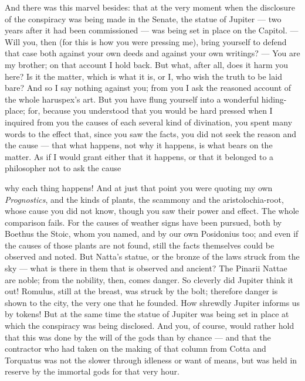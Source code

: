  And there was this marvel besides: that at the very moment when the disclosure of the conspiracy was being made in the Senate, the statue of Jupiter — two years after it had been commissioned — was being set in place on the Capitol. — Will you, then (for this is how you were pressing me), bring yourself to defend that case both against your own deeds and against your own writings? — You are my brother; on that account I hold back. But what, after all, does it harm you here? Is it the matter, which is what it is, or I, who wish the truth to be laid bare? And so I say nothing against you; from you I ask the reasoned account of the whole haruspex's art. But you have flung yourself into a wonderful hiding-place; for, because you understood that you would be hard pressed when I inquired from you the causes of each several kind of divination, you spent many words to the effect that, since you saw the facts, you did not seek the reason and the cause — that what happens, not why it happens, is what bears on the matter. As if I would grant either that it happens, or that it belonged to a philosopher not to ask the cause

 why each thing happens! And at just that point you were quoting my own \textit{Prognostics}, and the kinds of plants, the scammony and the aristolochia-root, whose cause you did not know, though you saw their power and effect. The whole comparison fails. For the causes of weather signs have been pursued, both by Boethus the Stoic, whom you named, and by our own Posidonius too; and even if the causes of those plants are not found, still the facts themselves could be observed and noted. But Natta's statue, or the bronze of the laws struck from the sky — what is there in them that is observed and ancient? The Pinarii Nattae are noble; from the nobility, then, comes danger. So cleverly did Jupiter think it out! Romulus, still at the breast, was struck by the bolt; therefore danger is shown to the city, the very one that he founded. How shrewdly Jupiter informs us by tokens! But at the same time the statue of Jupiter was being set in place at which the conspiracy was being disclosed. And you, of course, would rather hold that this was done by the will of the gods than by chance — and that the contractor who had taken on the making of that column from Cotta and Torquatus was not the slower through idleness or want of means, but was held in reserve by the immortal gods for that very hour.

